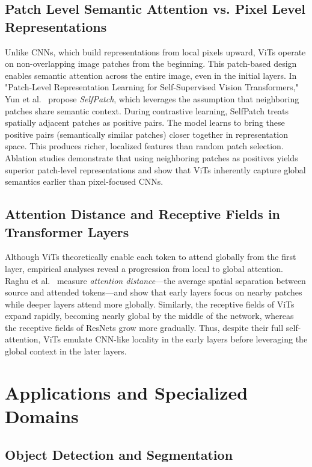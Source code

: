 \documentclass[conference]{IEEEtran}
\begin{document}
\subsection{Patch Level Semantic Attention vs. Pixel Level Representations}

Unlike CNNs, which build representations from local pixels upward, ViTs operate on non-overlapping image patches from the beginning. This patch-based design enables semantic attention across the entire image, even in the initial layers. In "Patch-Level Representation Learning for Self-Supervised Vision Transformers," Yun et al.~\cite{yun2022patch} propose \emph{SelfPatch}, which leverages the assumption that neighboring patches share semantic context. During contrastive learning, SelfPatch treats spatially adjacent patches as positive pairs. The model learns to bring these positive pairs (semantically similar patches) closer together in representation space. This produces richer, localized features than random patch selection. Ablation studies demonstrate that using neighboring patches as positives yields superior patch-level representations and show that ViTs inherently capture global semantics earlier than pixel-focused CNNs.

\subsection{Attention Distance and Receptive Fields in Transformer Layers}

Although ViTs theoretically enable each token to attend globally from the first layer, empirical analyses reveal a progression from local to global attention. Raghu et al.~\cite{raghu2021vision} measure \emph{attention distance}—the average spatial separation between source and attended tokens—and show that early layers focus on nearby patches while deeper layers attend more globally. Similarly, the receptive fields of ViTs expand rapidly, becoming nearly global by the middle of the network, whereas the receptive fields of ResNets grow more gradually. Thus, despite their full self-attention, ViTs emulate CNN-like locality in the early layers before leveraging the global context in the later layers.

\section{Applications and Specialized Domains}

\subsection{Object Detection and Segmentation}
\end{document}
